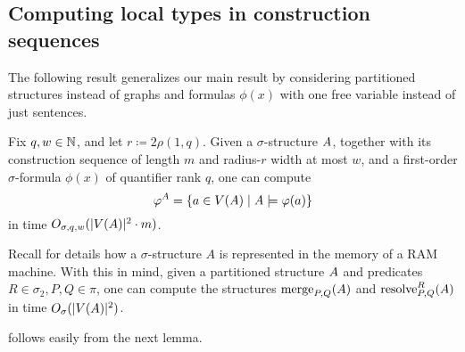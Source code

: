 \subsection{Computing local types in construction sequences}
\label{sec:step}
The following result generalizes our main result 
by considering partitioned structures instead of graphs and formulas $\phi(x)$ with one free variable instead of just sentences.
\begin{theorem}\label{thm:compute}
  Fix $q,w\in\mathbb N$, and let $r\coloneqq 2\rho(1,q)$.
 Given a $\sigma$-structure ${{A}}$, together
 with its construction sequence of length \(m\) and radius-$r$ width at most $w$,
 and a first-order $\sigma$-formula $\phi(x)$ of quantifier rank $q$,
 one can compute 
 $$\varphi^{{A}}=\{a\in V({{A}})\mid{{A}}\models \varphi(a)\}$$
in time 
 $O_{\sigma,q,w}(|V({{A}})|^2 \cdot m)$.
\end{theorem}


Recall 
for details how a \(\sigma\)-structure \(A\) is represented
in the memory of a RAM machine.
With this in mind, given a partitioned structure ${{A}}$ and predicates $R\in\sigma_2,P,Q\in\pi$,
one can compute the structures $\mathrm{merge}_{P,Q}({{A}})$ and $\mathrm{resolve}^{R}_{P,Q}({{A}})$ in time 
$O_{\sigma}(|V({{A}})|^2)$.







 follows easily from the next lemma.
  

